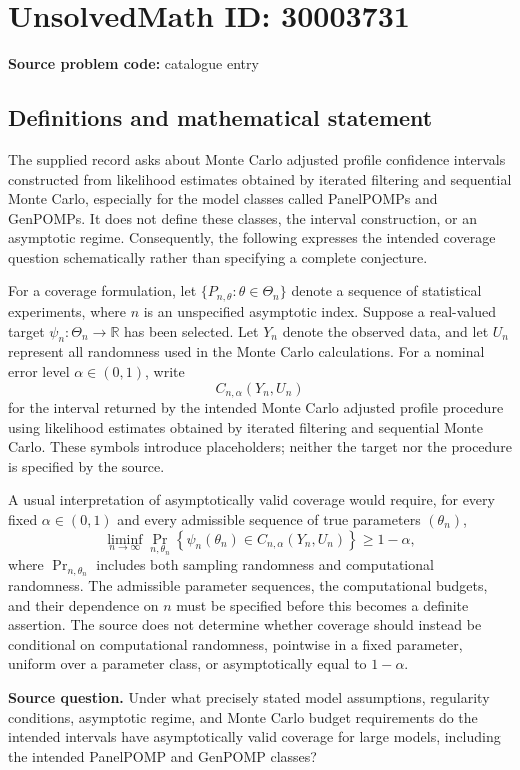 \documentclass[11pt]{article}
\newcommand{\R}{\mathbb{R}}
\begin{document}
\section*{UnsolvedMath ID: 30003731}
\textbf{Source problem code:} catalogue entry
\subsection{Definitions and mathematical statement}
The supplied record asks about Monte Carlo adjusted profile confidence intervals constructed from likelihood estimates obtained by iterated filtering and sequential Monte Carlo, especially for the model classes called PanelPOMPs and GenPOMPs. It does not define these classes, the interval construction, or an asymptotic regime. Consequently, the following expresses the intended coverage question schematically rather than specifying a complete conjecture.

For a coverage formulation, let \(\{P_{n,\theta}:\theta\in\Theta_n\}\) denote a sequence of statistical experiments, where \(n\) is an unspecified asymptotic index. Suppose a real-valued target \(\psi_n:\Theta_n\to\R\) has been selected. Let \(Y_n\) denote the observed data, and let \(U_n\) represent all randomness used in the Monte Carlo calculations. For a nominal error level \(\alpha\in(0,1)\), write
\[
C_{n,\alpha}(Y_n,U_n)
\]
for the interval returned by the intended Monte Carlo adjusted profile procedure using likelihood estimates obtained by iterated filtering and sequential Monte Carlo. These symbols introduce placeholders; neither the target nor the procedure is specified by the source.

A usual interpretation of asymptotically valid coverage would require, for every fixed \(\alpha\in(0,1)\) and every admissible sequence of true parameters \((\theta_n)\),
\[
\liminf_{n\to\infty}
\Pr_{n,\theta_n}\!\left\{
\psi_n(\theta_n)\in C_{n,\alpha}(Y_n,U_n)
\right\}
\geq 1-\alpha,
\]
where \(\Pr_{n,\theta_n}\) includes both sampling randomness and computational randomness. The admissible parameter sequences, the computational budgets, and their dependence on \(n\) must be specified before this becomes a definite assertion. The source does not determine whether coverage should instead be conditional on computational randomness, pointwise in a fixed parameter, uniform over a parameter class, or asymptotically equal to \(1-\alpha\).

\textbf{Source question.} Under what precisely stated model assumptions, regularity conditions, asymptotic regime, and Monte Carlo budget requirements do the intended intervals have asymptotically valid coverage for large models, including the intended PanelPOMP and GenPOMP classes?
\end{document}

